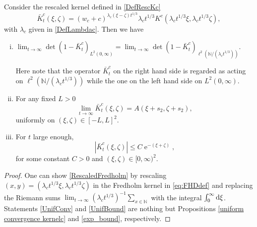 \documentclass[cmp]{svjour}
\numberwithin{theorem}{section}
\numberwithin{equation}{section}
\DeclareMathOperator{\e}{e}
\def\dd{{\rm d}}
\begin{document}
\begin{theorem}
\label{kernel1 limit}
Consider the rescaled kernel defined in \eqref{DefRescKc}
\begin{equation*}
 \bar{K}^c_t( \xi, \zeta)=(w_c + c)^{ \lambda_c (\xi-\zeta) t^{1/3}}
  \lambda_c t^{1/3}K^c(\lambda_c t^{1/3} \xi,\lambda_c t^{1/3} \zeta),
\end{equation*}
with $\lambda_c$ given in \eqref{DefLambdac}. Then we have
\begin{enumerate}[(i)]
\item \label{RescaledFredholm} $\displaystyle \lim_{t \to \infty} \det(1-  \bar{K}^c_t)_{L^2(0, \infty)}= \lim_{t \to \infty} \det(1-\bar{K}^c_t)_{\ell^2(\mathbb{N}/(\lambda_c t^{1/3}))}$.

Here note that the operator $\bar{K}^c_t$ on the right hand side is regarded as acting on $\ell^2(\mathbb{N}/(\lambda_c t^{1/3}))$ while the one on the left hand side on  $L^2(0,\infty)$.
\item \label{UnifConv}
  For any fixed $L>0$
  \begin{equation*}
    \lim_{t\rightarrow \infty}\bar{K}^c_t( \xi, \zeta)= A(\xi + s_2 , \zeta + s_2),
  \end{equation*}
  uniformly on $(\xi,\zeta)\in[-L,L]^2$.
\item \label{UnifBound} For $t$ large enough,
\begin{equation*}
  |\bar{K}^c_t( \xi, \zeta)| \leq C \e^{
  - (\xi + \zeta)},
\end{equation*}
for some constant $C>0$ and $(\xi,\zeta) \in {[0,\infty )}^2$.
\end{enumerate}

\end{theorem}

\begin{proof}
One can show \ref{RescaledFredholm} by rescaling $(x,y)=(\lambda_c t^{1/3} \xi,\lambda_c t^{1/3} \zeta)$ in the Fredholm kernel in \eqref{eq:FHDdef} and replacing the Riemann sums $\displaystyle \lim_{t \to \infty} {(\lambda_c t^{1/3})}^{-1} \sum_{x \in \mathbb{N}}$ with the integral $\int_{0}^{\infty} \dd \xi$.
Statements \ref{UnifConv} and \ref{UnifBound} are nothing but Propositions \ref{uniform convergence kernelc} and \ref{exp_bound}, respectively.
\end{proof}
\end{document}

